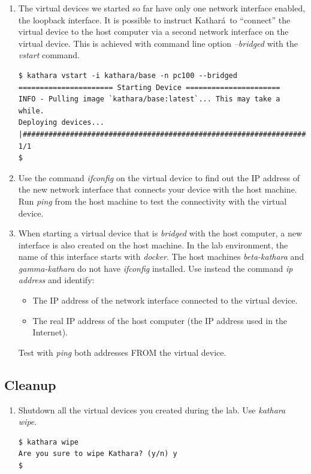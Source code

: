 \documentclass[12pt]{book}
\newcommand{\kathara}{Kathar\'a}
\begin{document}
\begin{enumerate}[resume*]
\item The virtual devices we started so far have only one network interface enabled, the loopback interface. It is possible to instruct \kathara\ to ``connect'' the virtual device to the host computer via a second network interface on the virtual device. This is achieved with command line option \emph{--bridged} with the \emph{vstart} command.

\begin{lstlisting}
$ kathara vstart -i kathara/base -n pc100 --bridged
====================== Starting Device ======================
INFO - Pulling image `kathara/base:latest`... This may take a while.
Deploying devices... |###############################################################################################| 1/1
$
\end{lstlisting}

\item Use the command \emph{ifconfig} on the virtual device to find out the IP address of the new network interface that connects your device with the host machine. Run \emph{ping} from the host machine to test the connectivity with the virtual device. 

\item When starting a virtual device that is \emph{bridged} with the host computer, a new interface is also created on the host machine. In the lab environment, the name of this interface starts with \emph{docker}. The host machines \emph{beta-kathara} and \emph{gamma-kathara} do not have \emph{ifconfig} installed. Use instead the command \emph{ip address} and identify:
\begin{itemize}[label=-]
\item The IP address of the network interface connected to the virtual device.
\item The real IP address of the host computer (the IP address used in the Internet).
\end{itemize}
Test with \emph{ping} both addresses FROM the virtual device. 
\end{enumerate}

\subsection{Cleanup}

\begin{enumerate}[resume*]
\item Shutdown all the virtual devices you created during the lab. Use \emph{kathara wipe}.

\begin{lstlisting}
$ kathara wipe
Are you sure to wipe Kathara? (y/n) y
$ 
\end{lstlisting}
\end{enumerate}
\end{document}
